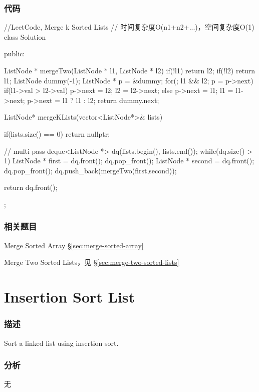 \subsubsection{代码}
\begin{Code}
//LeetCode, Merge k Sorted Lists
// 时间复杂度O(n1+n2+...)，空间复杂度O(1)
class Solution {
public:

    ListNode * mergeTwo(ListNode * l1, ListNode * l2){
        if(!l1) return l2;
        if(!l2) return l1;
        ListNode dummy(-1);
        ListNode * p = &dummy;
        for(; l1 && l2; p = p->next){
            if(l1->val > l2->val){
                p->next = l2; l2 = l2->next;
            }
            else{
                p->next = l1; l1 = l1->next;
            }
        }
        p->next = l1 ? l1 : l2;
        return dummy.next;
    }

    ListNode* mergeKLists(vector<ListNode*>& lists) {
        if(lists.size() == 0) return nullptr;

        // multi pass
        deque<ListNode *> dq(lists.begin(), lists.end());
        while(dq.size() > 1){
            ListNode * first = dq.front(); dq.pop_front();
            ListNode * second = dq.front(); dq.pop_front();
            dq.push_back(mergeTwo(first,second));
        }

        return dq.front();
    }
};
\end{Code}


\subsubsection{相关题目}
\begindot
\item Merge Sorted Array \S \ref{sec:merge-sorted-array}
\item Merge Two Sorted Lists，见 \S \ref{sec:merge-two-sorted-lists}
\myenddot


\section{Insertion Sort List} %
\label{sec:insertion-sort-list}


\subsubsection{描述}
Sort a linked list using insertion sort.


\subsubsection{分析}
无


